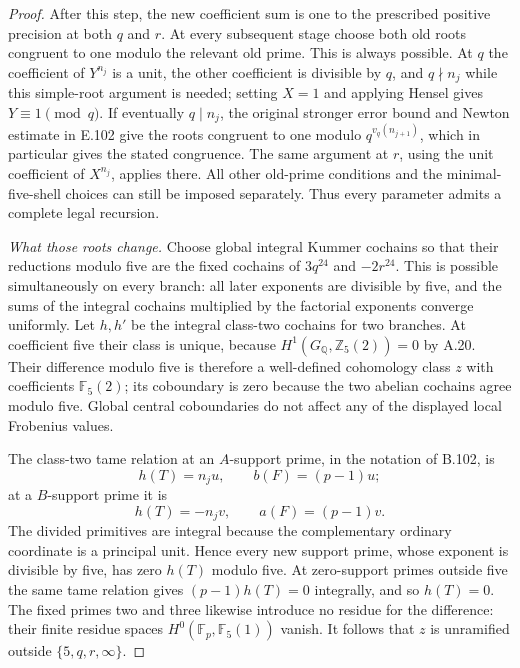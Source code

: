 \begin{proof}
After this step, the new coefficient sum is one to the prescribed
positive precision at both $q$ and $r$.  At every subsequent
stage choose both old roots congruent to one modulo the relevant
old prime.  This is always possible.  At $q$ the coefficient of
$Y^{n_j}$ is a unit, the other coefficient is divisible by $q$,
and $q\nmid n_j$ while this simple-root argument is needed;
setting $X=1$ and applying Hensel gives $Y\equiv1\pmod q$.
If eventually $q\mid n_j$, the original stronger error bound and
Newton estimate in E.102 give the roots congruent to one modulo
$q^{v_q(n_{j+1})}$, which in particular gives the stated
congruence.  The same argument at $r$, using the unit coefficient
of $X^{n_j}$, applies there.  All other old-prime conditions and
the minimal-five-shell choices can still be imposed separately.
Thus every parameter admits a complete legal recursion.

\emph{What those roots change.}
Choose global integral Kummer cochains so that their reductions
modulo five are the fixed cochains of $3q^{24}$ and $-2r^{24}$.
This is possible simultaneously on every branch: all later
exponents are divisible by five, and the sums of the integral
cochains multiplied by the factorial exponents converge uniformly.
Let $h,h'$ be the integral class-two cochains for two branches.
At coefficient five their class is unique, because
$H^1(G_{\mathbb Q},\mathbb Z_5(2))=0$ by A.20.
Their difference modulo five is therefore a well-defined
cohomology class $z$ with coefficients $\mathbb F_5(2)$;
its coboundary is zero because the two abelian cochains agree
modulo five.  Global central coboundaries do not affect any of
the displayed local Frobenius values.

The class-two tame relation at an $A$-support prime, in the
notation of B.102, is
\[
                  h(T)=n_j u,\qquad b(F)=(p-1)u;
\]
at a $B$-support prime it is
\[
                  h(T)=-n_j v,\qquad a(F)=(p-1)v.
 \tag{E.202.5}
\]
The divided primitives are integral because the complementary
ordinary coordinate is a principal unit.  Hence every new
support prime, whose exponent is divisible by five, has zero
$h(T)$ modulo five.  At zero-support primes outside five the
same tame relation gives $(p-1)h(T)=0$ integrally, and so
$h(T)=0$.  The fixed primes two and three likewise introduce
no residue for the difference: their finite residue spaces
$H^0(\mathbb F_p,\mathbb F_5(1))$ vanish.  It follows that
$z$ is unramified outside $\{5,q,r,\infty\}$.


\end{proof}
